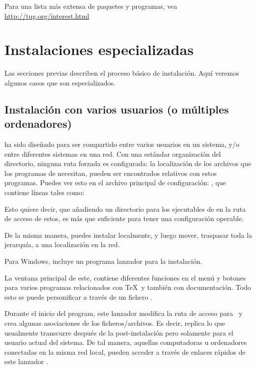 \documentclass{article}
\begin{document}
Para una lista más extensa de paquetes y programas, vea
\url{http://tug.org/interest.html}

\section{Instalaciones especializadas}

Las secciones previas describen el proceso básico de instalación. Aquí
veremos algunos casos que son especializados. 

\subsection{Instalación con varios usuarios (o múltiples ordenadores)}
\label{sec:sharedinstall}

\TL{} ha sido diseñado para ser compartido entre varios
usuarios en un sistema, y/o entre diferentes sistemas en una
red. Con una estándar organización del directorio, ninguna
ruta forzada es configurada: la localización de los archivos
que los programas de \TL{} necesitan, pueden ser encontrados
relativos con estos programas. Puedes ver esto en el archivo
principal de configuración:
, que contiene líneas tales como:
Esto quiere decir, que añadiendo un directorio para los ejecutables de
\TL{} en la ruta de acceso de estos, es más que suficiente para
tener una configuración operable. 

De la misma manera, puedes instalar \TL{} localmente, y
luego mover, traspasar toda la jerarquía, a una localización
en la red. 

Para Windows, \TL{} incluye un programa lanzador  para la instalación.

La ventana principal de este, contiene diferentes funciones en el menú y
botones para varios programas relacionados con \TeX\ y también con
documentación. Todo esto se puede personificar a través de un fichero .

Durante el inicio del program, este lanzador modifica la ruta de acceso para
\TL\ y crea algunas asociaciones de los ficheros/archivos. Es decir, replica lo
que usualmente transcurre después de la post-instalación pero solamente para el
usuario actual del sistema. De tal manera, aquellas computadoras u ordenadores
conectadas en la misma red local, pueden acceder \TL{} a través de enlaces
rápidos de este lanzador . 
\end{document}
